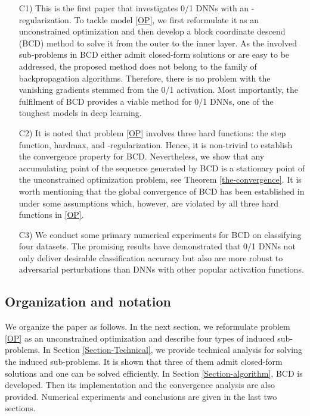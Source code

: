 \documentclass[journal]{IEEEtran}
\begin{document}
\begin{itemize}[leftmargin=20pt]
\item[C1)] This is the first paper that investigates  0/1  DNNs with an -regularization. To tackle model \eqref{OP}, we first reformulate it as an unconstrained optimization and then develop a block coordinate descend (BCD) method  to solve it from the outer to the inner layer. As the involved sub-problems in BCD either admit closed-form solutions or are easy to be addressed, the proposed method does not belong to the family of backpropagation algorithms. Therefore, there is no problem with the vanishing gradients stemmed from the 0/1 activation. Most importantly, the fulfilment of BCD provides a viable method for 0/1 DNNs, one of the toughest models in deep learning.

\item[C2)] It is noted that problem \eqref{OP} involves three hard functions: the step function, hardmax, and -regularization. Hence, it is non-trivial to establish the convergence property for BCD. Nevertheless, we show that any accumulating point of the sequence generated by BCD is a stationary point of the unconstrained optimization problem, see Theorem \ref{the-convergence}. It is worth mentioning that the global convergence of BCD has been established in \cite{Zhang2017, Lau2018, Zeng2019} under some assumptions which, however, are violated by all three hard functions in  \eqref{OP}.

\item[C3)] We conduct some primary numerical experiments for BCD on classifying four datasets. The promising results have demonstrated that 0/1 DNNs not only deliver desirable classification accuracy but also are more robust to adversarial perturbations \cite{Zheng2018} than DNNs with other popular activation functions.
\end{itemize}

\subsection{Organization and notation}
We organize the paper as follows. In the next section, we reformulate problem \eqref{OP} as an unconstrained optimization and describe four types of induced sub-problems. In Section \ref{Section-Technical}, we provide technical analysis for solving the induced sub-problems. It is shown that three of them admit closed-form solutions and one can be solved efficiently. In Section \ref{Section-algorithm}, BCD is developed. Then its implementation and the convergence analysis are also provided. Numerical experiments and conclusions are given in the last two sections.
\end{document}
